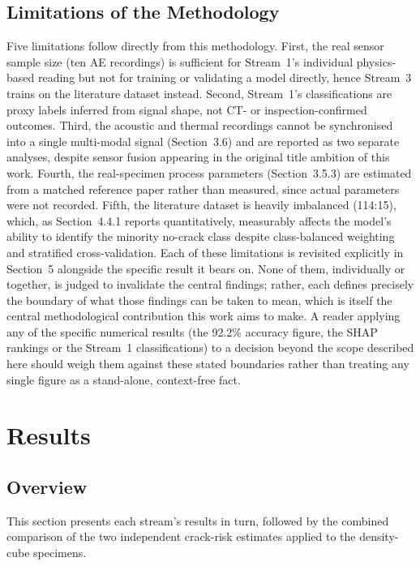 \documentclass[a4paper]{article}
\begin{document}
\subsection{Limitations of the Methodology}
Five limitations follow directly from this methodology. First, the real sensor sample size (ten AE recordings) is sufficient for Stream~1's individual physics-based reading but not for training or validating a model directly, hence Stream~3 trains on the literature dataset instead. Second, Stream~1's classifications are proxy labels inferred from signal shape, not CT- or inspection-confirmed outcomes. Third, the acoustic and thermal recordings cannot be synchronised into a single multi-modal signal (Section~3.6) and are reported as two separate analyses, despite sensor fusion appearing in the original title ambition of this work. Fourth, the real-specimen process parameters (Section~3.5.3) are estimated from a matched reference paper rather than measured, since actual parameters were not recorded. Fifth, the literature dataset is heavily imbalanced (114:15), which, as Section~4.4.1 reports quantitatively, measurably affects the model's ability to identify the minority no-crack class despite class-balanced weighting and stratified cross-validation. Each of these limitations is revisited explicitly in Section~5 alongside the specific result it bears on. None of them, individually or together, is judged to invalidate the central findings; rather, each defines precisely the boundary of what those findings can be taken to mean, which is itself the central methodological contribution this work aims to make. A reader applying any of the specific numerical results (the 92.2\% accuracy figure, the SHAP rankings or the Stream~1 classifications) to a decision beyond the scope described here should weigh them against these stated boundaries rather than treating any single figure as a stand-alone, context-free fact.

\section{Results}
\subsection{Overview}
This section presents each stream's results in turn, followed by the combined comparison of the two independent crack-risk estimates applied to the density-cube specimens.
\end{document}
